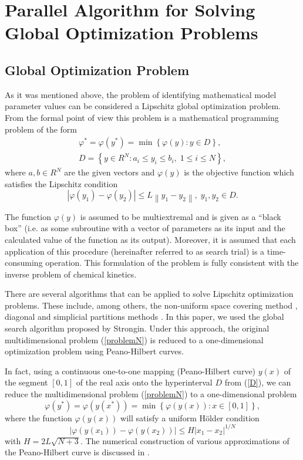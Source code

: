 \documentclass{svproc}
\begin{document}
\section{Parallel Algorithm for Solving Global Optimization Problems }\label{Sec_GSA}

\subsection{Global Optimization Problem}\label{Sec_GO_Problem}

As it was mentioned above, the problem of identifying mathematical model parameter values can be considered a Lipschitz global optimization problem. From the formal point of view this problem is a mathematical programming problem of the form
\begin{gather}
 \varphi^* = \varphi(y^\ast)=\min{\left\{\varphi(y):y\in D\right\}}, \label{problemN}\\
 D=\left\{y\in R^N: a_i\leq y_i \leq b_i, \;  1\leq i \leq N\right\} \label{D},
\end{gather}
where $a,b\in R^N$ are the given vectors and $\varphi(y)$ is the objective function which satisfies the Lipschitz condition
\begin{equation}\label{Lip}
\left|\varphi(y_1)-\varphi(y_2)\right|\leq L\left\|y_1-y_2\right\|,\; y_1,y_2 \in D.
\end{equation}


The function $\varphi(y)$ is assumed to be multiextremal and is given as a ``black box'' (i.e. as some subroutine with a vector of parameters as its input and the calculated value of the function as its output). Moreover, it is assumed that each application of this procedure (hereinafter referred to as search trial) is a time-consuming operation. This formulation of the problem is fully consistent with the inverse problem of chemical kinetics.

There are several algorithms that can be applied to solve Lipschitz optimization problems. These include, among others, the non-uniform space covering method \cite{Evtushenko2013, Evtushenko2009}, diagonal and simplicial partitions methods \cite{Zilinskas2010, Paulavicius2011}. In this paper, we used the global search algorithm proposed by Strongin\cite{Strongin2000}. Under this approach, the original multidimensional problem (\ref{problemN}) is reduced to a one-dimensional optimization problem using Peano-Hilbert curves.

In fact, using a continuous one-to-one mapping (Peano-Hilbert curve) $y(x)$ of the segment $[0,1]$ of the real axis onto the hyperinterval $D$ from (\ref{D}), we can reduce the multidimensional problem (\ref{problemN}) to a one-dimensional problem
\[
\varphi(y^\ast)=\varphi(y(x^\ast))=\min{\left\{\varphi(y(x)): x\in[0,1]\right\}},
\]
where the function $\varphi(y(x))$ will satisfy a uniform H{\"o}lder condition
\[
\left|\varphi(y(x_1))-\varphi(y(x_2))\right|\leq H\left|x_1-x_2\right|^{1/N}
\]
with $ H=2 L \sqrt{N+3}$.
The numerical construction of various approximations of the Peano-Hilbert curve is discussed in \cite{Strongin2000,Sergeyev2013}.
\end{document}
